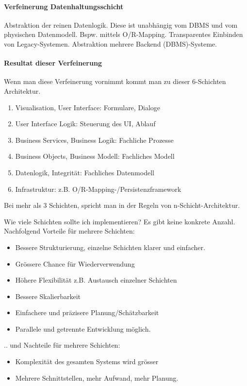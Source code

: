 \paragraph{Verfeinerung Datenhaltungsschicht} Abstraktion der reinen Datenlogik. Diese ist unabhängig vom DBMS und vom physischen Datenmodell. Bspw. mittels O/R-Mapping. Transparentes Einbinden von Legacy-Systemen. Abstraktion mehrere Backend (DBMS)-Systeme.

\paragraph{Resultat dieser Verfeinerung}
Wenn man diese Verfeinerung vornimmt kommt man zu dieser 6-Schichten Architektur.
\begin{enumerate}
	\item Visualisation, User Interface: Formulare, Dialoge 
	\item User Interface Logik: Steuerung des UI, Ablauf
	\item Business Services, Business Logik: Fachliche Prozesse
	\item Business Objects, Business Modell: Fachliches Modell
	\item Datenlogik, Integrität: Fachliches Datenmodell
	\item Infrastruktur: z.B. O/R-Mapping-/Persistenzframework
\end{enumerate}
Bei mehr als 3 Schichten, spricht man in der Regeln von n-Schicht-Architektur.

Wie viele Schichten sollte ich implementieren? Es gibt keine konkrete Anzahl. Nachfolgend Vorteile für mehrere Schichten:
\begin{itemize}
	\item Bessere Strukturierung, einzelne Schichten klarer und einfacher.
	\item Grössere Chance für Wiederverwendung
	\item Höhere Flexibilität z.B. Austausch einzelner Schichten
	\item Bessere Skalierbarkeit
	\item Einfachere und präzisere Planung/Schätzbarkeit
	\item Parallele und getrennte Entwicklung möglich.
\end{itemize}

.. und Nachteile für mehrere Schichten:
\begin{itemize}
	\item Komplexität des gesamten Systems wird grösser
	\item Mehrere Schnittstellen, mehr Aufwand, mehr Planung.
\end{itemize}

